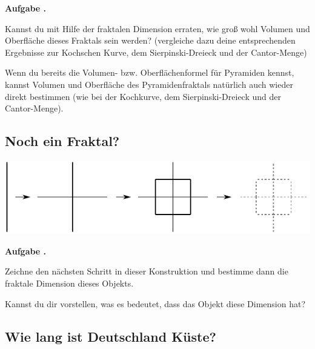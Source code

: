 \documentclass[a4paper,ngerman,12pt]{scrartcl}
\theoremstyle{definition}
\theoremstyle{plain}
\theoremstyle{remark}
\newlength{\aufgabenskip}
\newcounter{aufgabennummer}
\newenvironment{aufgabe}[1]{
  \addtocounter{aufgabennummer}{1}
  \textbf{Aufgabe \theaufgabennummer.} \emph{#1} \par
}{\vspace{\aufgabenskip}}
\begin{document}
\begin{aufgabe}{}
	Kannst du mit Hilfe der fraktalen Dimension erraten,  wie groß wohl Volumen und Oberfläche dieses Fraktals sein werden? (vergleiche dazu deine entsprechenden Ergebnisse zur Kochschen Kurve, dem Sierpinski-Dreieck und der Cantor-Menge) 
	
	Wenn du bereits die Volumen- bzw. Oberflächenformel für Pyramiden kennst, kannst Volumen und Oberfläche des Pyramidenfraktals natürlich auch wieder direkt bestimmen (wie bei der Kochkurve, dem Sierpinski-Dreieck und der Cantor-Menge).
\end{aufgabe}
 
%


\subsection{Noch ein Fraktal?}

\begin{center}
	\includegraphics{Bilder/Nicht-Fraktal.pdf}
\end{center}

\begin{aufgabe}{}
	Zeichne den nächsten Schritt in dieser Konstruktion und bestimme dann die fraktale Dimension dieses Objekts.
	
	Kannst du dir vorstellen, was es bedeutet, dass das Objekt diese Dimension hat?
\end{aufgabe}

\subsection{Wie lang ist Deutschland Küste?}
\end{document}
